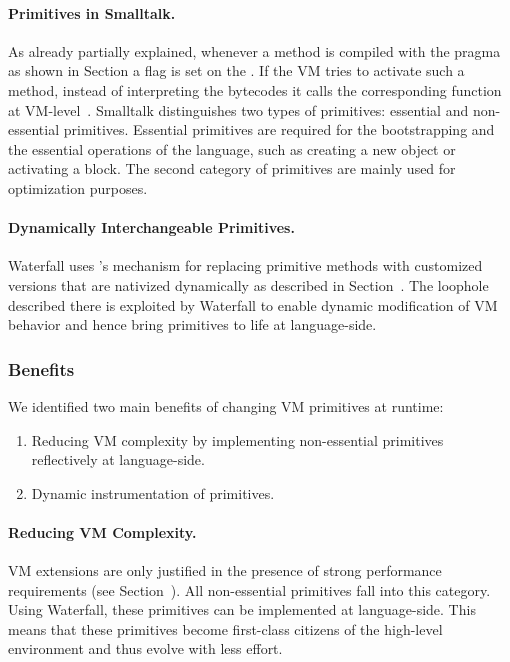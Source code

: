 \paragraph{Primitives in Smalltalk.}
As already partially explained, whenever a method is compiled with the  pragma as shown in Section  a flag is set on the . 
If the VM tries to activate such a method, instead of interpreting the bytecodes it calls the corresponding function at VM-level~\cite{Gold83a}.
Smalltalk distinguishes two types of primitives: essential and non-essential primitives.
Essential primitives are required for the bootstrapping and the essential operations of the language, such as creating a new object or activating a block.
The second category of primitives are mainly used for optimization purposes.

\paragraph{Dynamically Interchangeable Primitives.}
Waterfall uses \B's mechanism for replacing primitive methods with customized versions that are nativized dynamically as described in Section~.
The loophole described there is exploited by Waterfall to enable dynamic modification of VM behavior and hence bring primitives to life at language-side.


\subsubsection{Benefits} 
We identified two main benefits of changing VM primitives at runtime:

\begin{enumerate}
	\item Reducing VM complexity by implementing non-essential primitives reflectively at language-side.
	\item Dynamic instrumentation of primitives.
\end{enumerate}

\paragraph{Reducing VM Complexity.}
VM extensions are only justified in the presence of strong performance requirements (see Section~).
All non-essential primitives fall into this category.
Using Waterfall, these primitives can be implemented at language-side.
This means that these primitives become first-class citizens of the high-level environment and thus evolve with less effort.

